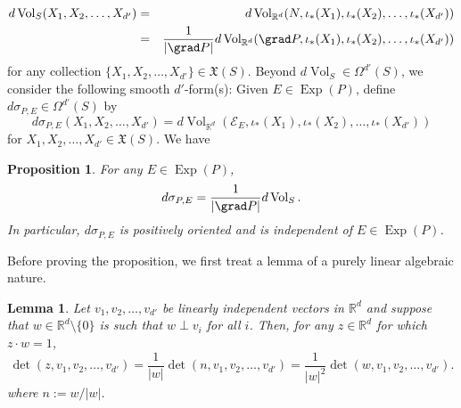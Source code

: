 \documentclass[11pt, letter]{book}
\newtheorem{lemma}[theorem]{Lemma}
\newtheorem{proposition}[theorem]{Proposition}
\newcommand\Exp{\operatorname{Exp}}
\renewcommand\det{\operatorname{det}}
\newcommand{\Vol}{\operatorname{Vol}}
\begin{document}
\begin{eqnarray*}
    d\Vol_S(X_1,X_2,\dots,X_{d'})&=&d\Vol_{\mathbb{R}^d}(N,\iota_*(X_1),\iota_*(X_2),\dots,\iota_*(X_{d'}))\\
    &=&\frac{1}{|\grad P|}d\Vol_{\mathbb{R}^d}(\grad P,\iota_*(X_1),\iota_*(X_2),\dots,\iota_*(X_{d'}))
\end{eqnarray*}
for any collection $\{X_1,X_2,\dots,X_{d'}\}\in \mathfrak{X}(S)$. Beyond $d\Vol_S\in \Omega^{d'}(S)$, we consider the following smooth $d'$-form(s): Given $E\in \Exp(P)$, define $d\sigma_{P,E}\in\Omega^{d'}(S)$ by
\begin{equation*}
    d\sigma_{P,E}(X_1,X_2,\dots,X_{d'})=d\Vol_{\mathbb{R}^d}(\mathcal{E}_E,\iota_*(X_1),\iota_*(X_2),\dots,\iota_*(X_{d'}))
\end{equation*}
for $X_1,X_2,\dots,X_{d'}\in\mathfrak{X}(S)$. We have
\begin{framed}
\begin{proposition}\label{prop:FormRiemannRelation}
For any $E\in\Exp(P)$,
\begin{equation*}
    d\sigma_{P,E}=\frac{1}{|\grad P|}d\Vol_S.
\end{equation*}
In particular, $d\sigma_{P,E}$ is positively oriented and is independent of $E\in\Exp(P)$.
\end{proposition}
\end{framed}
\noindent Before proving the proposition, we first treat a lemma of a purely linear algebraic nature. 

\begin{framed}
\begin{lemma}\label{lem:determinants}
Let $v_1,v_2,\dots,v_{d'}$ be linearly independent vectors in $\mathbb{R}^d$ and suppose that $w\in\mathbb{R}^d \setminus\{0\}$ is such that $w\perp v_i$ for all $i$. Then, for any $z\in\mathbb{R}^d$ for which $z\cdot w=1$,
\begin{equation*}
\det(z, v_1,v_2,\dots,v_{d'})=\frac{1}{|w|}\det(n,v_1,v_2,\dots,v_{d'})=\frac{1}{|w|^2}\det(w,v_1,v_2,\dots,v_{d'}).
\end{equation*}
where $n:=w/|w|$.
\end{lemma}
\end{framed}
\end{document}
